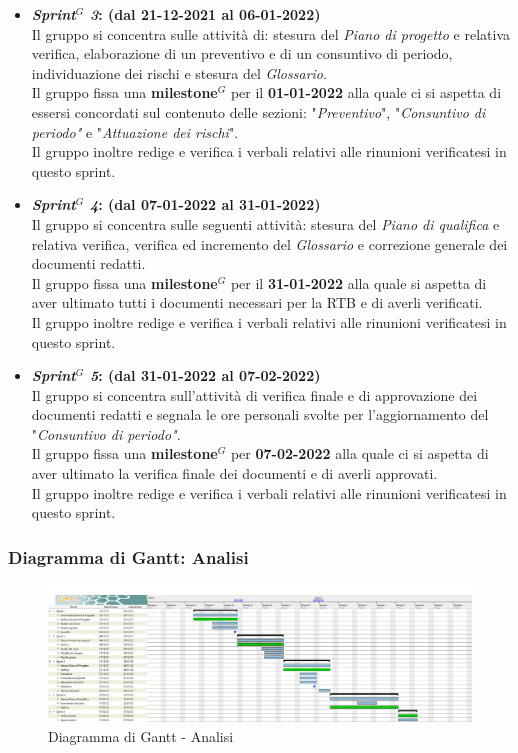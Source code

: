 \begin{itemize}
    \item \textbf{\textit{Sprint$^G$  3}: (dal 21-12-2021 al 06-01-2022)}\\
    Il gruppo si concentra sulle attività di: stesura del \textit{Piano di progetto} e relativa verifica, elaborazione di un preventivo e di un consuntivo di periodo, individuazione dei rischi e stesura del \textit{Glossario}.\\
    Il gruppo fissa una \textbf{milestone}$^G$  per il \textbf{01-01-2022} alla quale ci si aspetta di essersi concordati sul contenuto delle sezioni: "\textit{Preventivo}", "\textit{Consuntivo di periodo"} e "\textit{Attuazione dei rischi}".\\
    Il gruppo inoltre redige e verifica i verbali relativi alle rinunioni verificatesi in questo sprint.

    \item \textbf{\textit{Sprint$^G$  4}: (dal 07-01-2022 al 31-01-2022)}\\
    Il gruppo si concentra sulle seguenti attività: stesura del \textit{Piano di qualifica} e relativa verifica, verifica ed incremento del \textit{Glossario} e correzione generale dei documenti redatti.\\
    Il gruppo fissa una \textbf{milestone}$^G$  per il \textbf{31-01-2022} alla quale si aspetta di aver ultimato tutti i documenti necessari per la RTB e di averli verificati.\\
    Il gruppo inoltre redige e verifica i verbali relativi alle rinunioni verificatesi in questo sprint.

    \item \textbf{\textit{Sprint$^G$  5}: (dal 31-01-2022 al 07-02-2022)}\\
    Il gruppo si concentra sull'attività di verifica finale e di approvazione dei documenti redatti  e segnala le ore personali svolte per l'aggiornamento del "\textit{Consuntivo di periodo"}. \\
    Il gruppo fissa una \textbf{milestone}$^G$  per \textbf{07-02-2022} alla quale ci si aspetta di aver ultimato la verifica finale dei documenti e di averli approvati.\\
    Il gruppo inoltre redige e verifica i verbali relativi alle rinunioni verificatesi in questo sprint.
\end{itemize}
\newpage
\subsubsection{Diagramma di Gantt: Analisi}
\begin{figure}[h!]
    \centering
    \includegraphics[scale=0.22]{../../assets/Diagrammi_Gantt/Analisi.png}
    \caption{Diagramma di Gantt - Analisi}
\end{figure}


